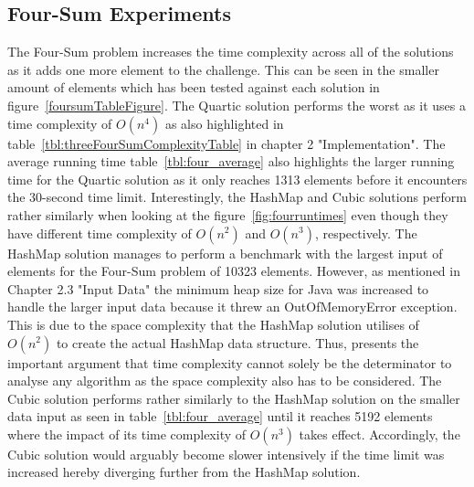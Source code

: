 \documentclass[12pt, a4paper]{article}
\begin{document}
\subsection{Four-Sum Experiments}
The Four-Sum problem increases the time complexity across all of the solutions as it adds one more element to the challenge. This can be seen in the smaller amount of elements which has been tested against each solution in figure~\ref{foursumTableFigure}. The Quartic solution performs the worst as it uses a time complexity of \(O(n^4)\) as also highlighted in table~\ref{tbl:threeFourSumComplexityTable} in chapter 2 "Implementation". The average running time table~\ref{tbl:four_average} also highlights the larger running time for the Quartic solution as it only reaches 1313 elements before it encounters the 30-second time limit. Interestingly, the HashMap and Cubic solutions perform rather similarly when looking at the figure~\ref{fig:fourruntimes} even though they have different time complexity of \(O(n^2)\) and \(O(n^3)\), respectively. The HashMap solution manages to perform a benchmark with the largest input of elements for the Four-Sum problem of 10323 elements. However, as mentioned in Chapter 2.3 "Input Data" the minimum heap size for Java was increased to handle the larger input data because it threw an OutOfMemoryError exception. This is due to the space complexity that the HashMap solution utilises of \(O(n^2)\) to create the actual HashMap data structure. Thus, presents the important argument that time complexity cannot solely be the determinator to analyse any algorithm as the space complexity also has to be considered. \newline The Cubic solution performs rather similarly to the HashMap solution on the smaller data input as seen in table~\ref{tbl:four_average} until it reaches 5192 elements where the impact of its time complexity of \(O(n^3)\) takes effect. Accordingly, the Cubic solution would arguably become slower intensively if the time limit was increased hereby diverging further from the HashMap solution.
\end{document}
